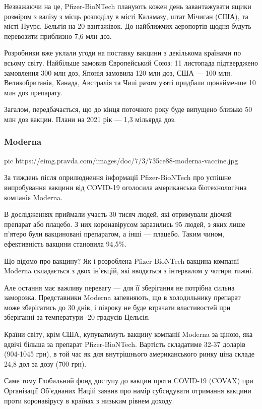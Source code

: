 Незважаючи на це, Pfizer-BioNTech планують кожен день завантажувати ящики
розміром з валізу з місць розподілу в місті Каламазу, штат Мічиган (США), та
місті Пуурс, Бельгія на 20 вантажівок. До найближчих аеропортів щодня будуть
перевозити приблизно 7,6 млн доз.

Розробники вже уклали угоди на поставку вакцини з декількома країнами по всьому
світу. Найбільше замовив Європейський Союз: 11 листопада підтверджено
замовлення 300 млн доз, Японія замовила 120 млн доз, США --- 100 млн.
Великобританія, Канада, Австралія та Чилі разом узяті придбали щонайменше 10
млн доз препарату.

Загалом, передбачається, що до кінця поточного року буде випущено близько
50 млн доз вакцин. Плани на 2021 рік --- 1,3 мільярда доз.

\subsubsection{Moderna}

\ifcmt
pic https://eimg.pravda.com/images/doc/7/3/735ce88-moderna-vaccine.jpg
\fi

За тиждень після оприлюднення інформації Pfizer-BioNTech про успішне
випробування вакцини від COVID-19 оголосила американська біотехнологічна
компанія Moderna.

В дослідженнях приймали участь 30 тисяч людей, які отримували діючий препарат
або плацебо. З них коронавірусом заразились 95 людей, з яких лише п'ятеро були
вакциновані препаратом, а інші --- плацебо. Таким чином, ефективність вакцини
становила 94,5\%.

Що відомо про вакцину? Як і розроблена Pfizer-BioNTech вакцина компанії Moderna
складається з двох ін’єкцій, які вводяться з інтервалом у чотири тижні.

Але остання має важливу перевагу --- для її зберігання не потрібна сильна
заморозка. Представники Moderna запевняють, що в холодильнику препарат може
зберігатись до 30 днів, і півроку не буде втрачати властивостей при зберіганні
за температури -20 градусів Цельсія.

Країни світу, крім США, купуватимуть вакцину компанії Moderna за ціною, яка
вдвічі більша за препарат Pfizer-BioNTech. Вартість складатиме 32-37 доларів
(904-1045 грн), в той час як для внутрішнього американського ринку ціна складе
24,8 дол за дозу (700 грн).

Саме тому Глобальний фонд доступу до вакцин проти COVID-19 (COVAX) при
Організації Об'єднаних Націй заявив про намір субсидувати отримання вакцини
проти коронавірусу в країнах з низьким рівнем доходу.

